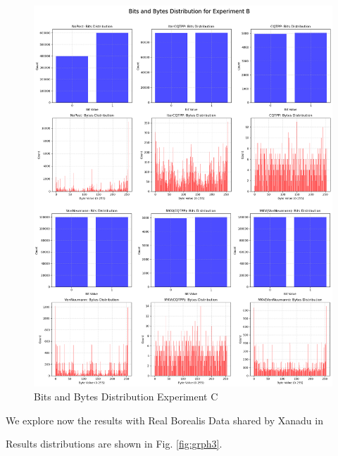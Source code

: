 \begin{figure}[h!]
    \centering
    \includegraphics[width=\textwidth]{figures/ExperimentB Dists.png}
    \caption{Bits and Bytes Distribution Experiment C}
    \label{fig:grph2}
\end{figure}

We explore now the results with Real Borealis Data shared by Xanadu in \cite{data}

\noindent Results distributions are shown in Fig. \ref{fig:grph3}.

